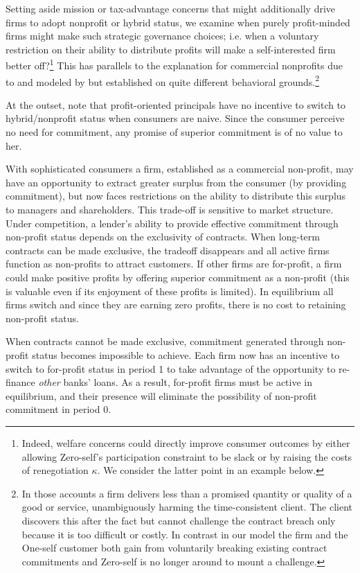 \documentclass[11pt,english]{article}
\theoremstyle{plain}
\theoremstyle{definition}
\begin{document}
Setting aside mission or tax-advantage concerns that might additionally drive firms to adopt nonprofit
or hybrid status, we examine when purely profit-minded firms might
make such strategic governance choices; i.e. when a voluntary restriction
on their ability to distribute profits will make a self-interested firm better
off?\footnote{Indeed, welfare concerns could directly improve consumer outcomes
by either allowing Zero-self's participation constraint to be slack
or by raising the costs of renegotiation $\kappa$. We consider the
latter point in an example below.} This has parallels to the explanation for commercial nonprofits due
to \citet{hansmann1996a} and modeled by \citet{glaeser2001} but
established on quite different behavioral grounds.\footnote{In those  accounts a firm delivers less than a promised quantity or
quality of a good or service, unambiguously harming the time-consistent
client. The client discovers this after the fact but cannot challenge
the contract breach only because it is too difficult or costly. In
contrast in our model the firm and the One-self customer both gain
from voluntarily breaking existing contract commitments and Zero-self
is no longer around to mount a challenge.}

At the outset, note that profit-oriented principals
have no incentive to switch to hybrid/nonprofit status when consumers
are naive. Since the consumer perceive no need for commitment,
any promise of superior commitment is of no value to her. 

With sophisticated consumers a firm, established as a commercial non-profit, may have  an opportunity to extract greater surplus
from the consumer (by providing commitment), but now faces restrictions
on the ability to distribute this surplus to managers and shareholders.
This trade-off is sensitive to market structure. Under competition,
a lender's ability to provide effective commitment through non-profit
status depends on the exclusivity of contracts. When long-term contracts
can be made exclusive, the tradeoff disappears and all active firms
function as non-profits to attract customers. If other firms are for-profit,
a firm could make positive profits by offering superior commitment
as a non-profit (this is valuable even if its enjoyment of these profits
is limited).
In equilibrium all firms switch and since they are earning zero profits, there is no cost to retaining non-profit status.

When contracts cannot be made exclusive, commitment generated through non-profit
status becomes impossible to achieve. Each firm now has an incentive to switch to
for-profit status in period 1 to take advantage of the opportunity to re-finance
\textit{other} banks' loans. As a result, for-profit firms must be
active in equilibrium, and their presence will eliminate the possibility
of non-profit commitment in period 0.
\end{document}
